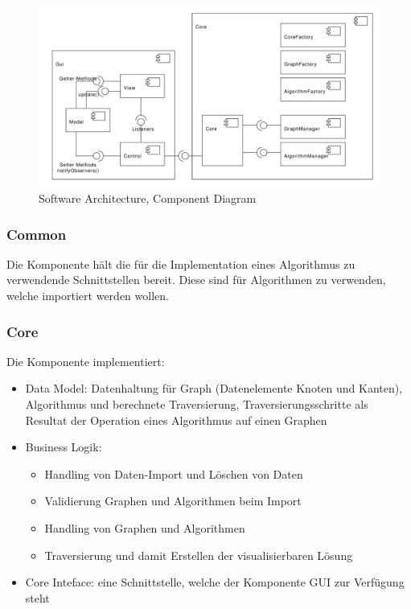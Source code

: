 \begin{figure}[H]
    \centering
    \includegraphics[scale=0.5]{diagrams/component-diagram.pdf}
    \caption{Software Architecture, Component Diagram}
    \label{fig:component-diagram}
\end{figure}
% 
\subsubsection{Common}
\label{subsubsec:Common}
Die Komponente h\"alt die f\"ur die Implementation eines Algorithmus zu verwendende Schnittstellen bereit. Diese sind f\"ur Algorithmen zu verwenden, welche importiert werden wollen.
% 
\subsubsection{Core}
\label{subsubsec:Core}
Die Komponente implementiert:
\begin{itemize}
  \item Data Model: Datenhaltung f\"ur Graph (Datenelemente Knoten und Kanten), Algorithmus und berechnete Traversierung, Traversierungsschritte als Resultat der Operation eines Algorithmus auf einen Graphen
  \item Business Logik: 
  \begin{itemize}
      \item Handling von Daten-Import und L\"oschen von Daten
      \item Validierung Graphen und Algorithmen beim Import
      \item Handling von Graphen und Algorithmen
      \item Traversierung und damit Erstellen der visualisierbaren L\"osung
  \end{itemize}
  \item Core Inteface: eine Schnittstelle, welche der Komponente GUI zur Verf\"ugung steht
\end{itemize}
% 
